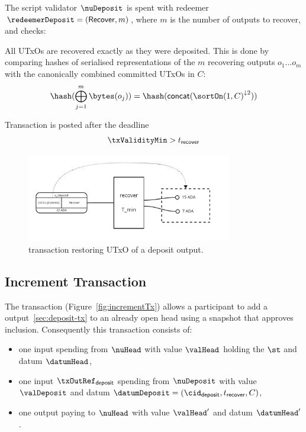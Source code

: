 \noindent The script validator $\nuDeposit$ is spent with redeemer
$\redeemerDeposit = (\mathsf{Recover}, m)$, where $m$ is the number of outputs
to recover, and checks:
\begin{menumerate}
  \item All UTxOs are recovered exactly as they were deposited. This is done by
  comparing hashes of serialised representations of the $m$ recovering outputs
  $o_{1} \dots o_{m}$ with the canonically combined committed UTxOs in $C$:
  \[
    \hash(\bigoplus_{j=1}^{m} \bytes(o_{j})) = \hash(\mathsf{concat}({\sortOn(1, C)}^{\downarrow2}))
  \]
  \item Transaction is posted after the deadline
  \[
    \txValidityMin > t_{\mathsf{recover}}
  \]
\end{menumerate}

\begin{figure}
  \centering
  \includegraphics[width=0.8\textwidth]{Hydra/Protocol/Figures/recover-tx}
  \caption{\mtxRecover{} transaction restoring UTxO of a deposit
	output.}\label{fig:recoverTx}
\end{figure}

\subsection{Increment Transaction}\label{sec:increment-tx}

\noindent The \mtxIncrement{} transaction (Figure~\ref{fig:incrementTx}) allows
a participant to add a \mtxDeposit{} output~\ref{sec:deposit-tx} to an already
open head using a snapshot that approves inclusion. Consequently this
transaction consists of:

\begin{itemize}
  \item one input spending from $\nuHead$ with value $\valHead$ holding the
        $\st$ and datum $\datumHead$,
  \item one input $\txOutRef_{\mathsf{deposit}}$ spending from $\nuDeposit$ with value $\valDeposit$ and datum
        $\datumDeposit = (\cid_{\mathsf{deposit}}, t_{\mathsf{recover}}, C)$,
  \item one output paying to $\nuHead$ with value $\valHead'$ and datum
        $\datumHead'$.
\end{itemize}

